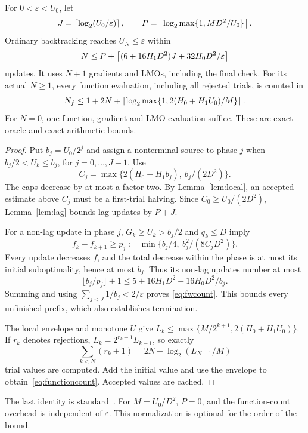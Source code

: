 \begin{theorem}\label{thm:fw}
For $0<\varepsilon<U_0$, let
\[
 J=\left\lceil\log_2(U_0/\varepsilon)\right\rceil,\qquad
 P=\left\lceil\log_2\max\{1,MD^2/U_0\}\right\rceil.
\]
Ordinary backtracking reaches $U_N\le\varepsilon$ within
\begin{equation}\label{eq:fwcount}
 N\le P+\left\lceil(6+16H_1D^2)J+32H_0D^2/\varepsilon\right\rceil
\end{equation}
updates. It uses $N+1$ gradients and LMOs, including the final check.
For its actual $N\ge1$, every function evaluation, including all
rejected trials, is counted in
\begin{equation}\label{eq:functioncount}
 N_f\le1+2N+\left\lceil\log_2\max\{1,2(H_0+H_1U_0)/M\}\right\rceil.
\end{equation}
For $N=0$, one function, gradient and LMO evaluation suffice.
These are exact-oracle and exact-arithmetic bounds.
\end{theorem}
\begin{proof}
Put $b_j=U_0/2^j$ and assign a nonterminal source to phase $j$ when
$b_j/2<U_k\le b_j$, for $j=0,\ldots,J-1$.
Use
\[
 C_j=\max\{2(H_0+H_1b_j),\ b_j/(2D^2)\}.
\]
The caps decrease by at most a factor two. By
Lemma~\ref{lem:local}, an accepted estimate above $C_j$ must be a
first-trial halving. Since $C_0\ge U_0/(2D^2)$,
Lemma~\ref{lem:lag} bounds lag updates by $P+J$.

For a non-lag update in phase $j$, $G_k\ge U_k>b_j/2$ and
$q_k\le D$ imply
\[
 f_k-f_{k+1}\ge p_j:=\min\{b_j/4,\ b_j^2/(8C_jD^2)\}.
\]
Every update decreases $f$, and the total decrease within the phase
is at most its initial suboptimality, hence at most $b_j$.
Thus its non-lag updates number at most
\[
 \lfloor b_j/p_j\rfloor+1
 \le5+16H_1D^2+16H_0D^2/b_j.
\]
Summing and using $\sum_{j<J}1/b_j<2/\varepsilon$ proves
\eqref{eq:fwcount}. This bounds every unfinished prefix, which also
establishes termination.

The local envelope and monotone $U$ give
$L_k\le\max\{M/2^{k+1},2(H_0+H_1U_0)\}$.
If $r_k$ denotes rejections, $L_k=2^{r_k-1}L_{k-1}$, so exactly
\[
 \sum_{k<N}(r_k+1)=2N+\log_2(L_{N-1}/M)
\]
trial values are computed. Add the initial value and use the envelope
to obtain~\eqref{eq:functioncount}. Accepted values are cached.
\end{proof}

The last identity is standard~\cite{pedregosa}. For $M=U_0/D^2$,
$P=0$, and the function-count overhead is independent of
$\varepsilon$. This normalization is optional for the order of the bound.


